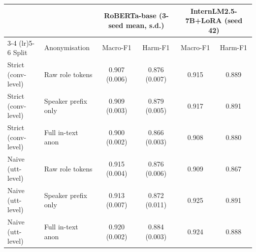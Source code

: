 \begin{tabular}{llcccc}
\toprule
& & \multicolumn{2}{c}{RoBERTa-base (3-seed mean, s.d.)} & \multicolumn{2}{c}{InternLM2.5-7B+LoRA (seed 42)} \\
\cmidrule(lr){3-4} \cmidrule(lr){5-6}
Split & Anonymisation & Macro-F1 & Harm-F1 & Macro-F1 & Harm-F1 \\
\midrule
Strict (conv-level) & Raw role tokens & 0.907 (0.006) & 0.876 (0.007) & 0.915 & 0.889 \\
Strict (conv-level) & Speaker prefix only & 0.909 (0.003) & 0.879 (0.005) & 0.917 & 0.891 \\
Strict (conv-level) & Full in-text anon & 0.900 (0.002) & 0.866 (0.003) & 0.908 & 0.880 \\
Naive (utt-level) & Raw role tokens & 0.915 (0.004) & 0.876 (0.006) & 0.909 & 0.867 \\
Naive (utt-level) & Speaker prefix only & 0.913 (0.007) & 0.872 (0.011) & 0.925 & 0.891 \\
Naive (utt-level) & Full in-text anon & 0.920 (0.002) & 0.884 (0.003) & 0.924 & 0.888 \\
\bottomrule
\end{tabular}
